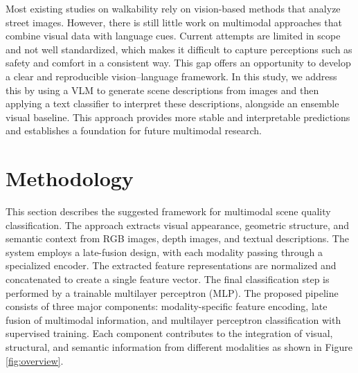 \documentclass[11pt]{article}
\begin{document}
Most existing studies on walkability rely on vision-based methods that analyze street images. However, there is still little work on multimodal approaches that combine visual data with language cues. Current attempts are limited in scope and not well standardized, which makes it difficult to capture perceptions such as safety and comfort in a consistent way. This gap offers an opportunity to develop a clear and reproducible vision–language framework. In this study, we address this by using a VLM to generate scene descriptions from images and then applying a text classifier to interpret these descriptions, alongside an ensemble visual baseline. This approach provides more stable and interpretable predictions and establishes a foundation for future multimodal research.



\section{Methodology}

This section describes the suggested framework for multimodal scene quality classification. The approach extracts visual appearance, geometric structure, and semantic context from RGB images, depth images, and textual descriptions. The system employs a late-fusion design, with each modality passing through a specialized encoder. The extracted feature representations are normalized and concatenated to create a single feature vector. The final classification step is performed by a trainable multilayer perceptron (MLP). The proposed pipeline consists of three major components: modality-specific feature encoding, late fusion of multimodal information, and multilayer perceptron classification with supervised training. Each component contributes to the integration of visual, structural, and semantic information from different modalities as shown in Figure \ref{fig:overview}.
\end{document}
